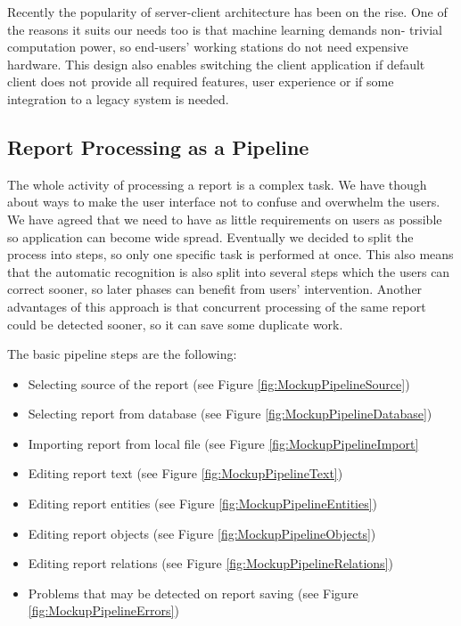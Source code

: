 


Recently the popularity of server-client architecture has been on the rise. One
of the reasons it suits our needs too is that machine learning demands non-
trivial computation power, so end-users' working stations do not need expensive
hardware. This design also enables switching the client application if default
\textan{} client does not provide all required features, user experience or if
some integration to a legacy system is needed.

\subsection{Report Processing as a Pipeline}
\label{ssec:ReportPipeline}

The whole activity of processing a report is a complex task. We have though
about ways to make the user interface not to confuse and overwhelm the users.
We have agreed that we need to have as little requirements on users as possible
so application can become wide spread. Eventually we decided to split the
process into steps, so only one specific task is performed at once. This also
means that the automatic recognition is also split into several steps which the
users can correct sooner, so later phases can benefit from users' intervention.
Another advantages of this approach is that concurrent processing of the same
report could be detected sooner, so it can save some duplicate work.

The basic pipeline steps are the following:
\begin{itemize}
	\item Selecting source of the report (see Figure \ref{fig:MockupPipelineSource})
	\item Selecting report from database (see Figure \ref{fig:MockupPipelineDatabase})
	\item Importing report from local file (see Figure \ref{fig:MockupPipelineImport}
	\item Editing report text (see Figure \ref{fig:MockupPipelineText})
	\item Editing report entities (see Figure \ref{fig:MockupPipelineEntities})
	\item Editing report objects (see Figure \ref{fig:MockupPipelineObjects})
	\item Editing report relations (see Figure \ref{fig:MockupPipelineRelations})
	\item Problems that may be detected on report saving (see Figure \ref{fig:MockupPipelineErrors})
\end{itemize}

